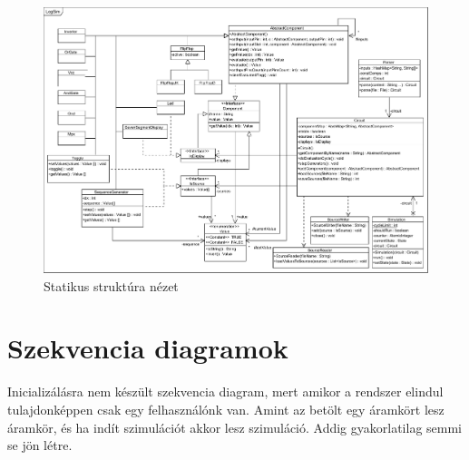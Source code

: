 \begin{figure}[H]
\begin{center}
\includegraphics[angle=90, width=17cm]{chapters/chapter04/classdiagram/class.pdf}
\caption{Statikus struktúra nézet}
\label{fig:class_diagram}
\end{center}
\end{figure}
%
%
%

\section{Szekvencia diagramok}
Inicializálásra nem készült szekvencia diagram, mert amikor a rendszer elindul tulajdonképpen csak egy felhasználónk van. Amint az betölt egy áramkört lesz áramkör, és ha indít szimulációt akkor lesz szimuláció. Addig gyakorlatilag semmi se jön létre.

